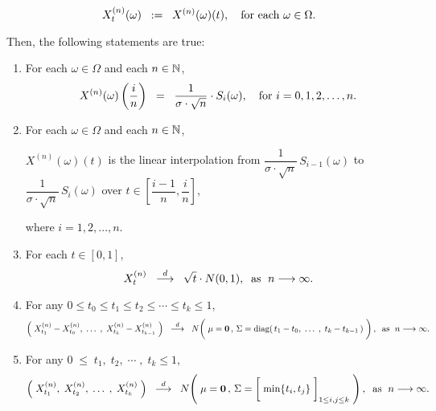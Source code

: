 \begin{proposition}
\begin{itemize}
\begin{equation*}
		X^{(n)}_{t}(\omega) \;\; := \;\; X^{(n)}(\omega)(t),
		\quad
		\textnormal{for each $\omega \in \Omega$}.
		\end{equation*}
\end{itemize}
Then, the following statements are true:
\begin{enumerate}
\item	For each $\omega \in \Omega$ and each $n \in \mathbb{N}$,
		\begin{equation*}
		X^{(n)}(\omega)\left(\dfrac{i}{n}\right) \;\; = \;\; \dfrac{1}{\sigma\cdot\sqrt{n}}\cdot S_{i}(\omega),
		\quad
		\textnormal{for $i = 0, 1, 2, \ldots, n$}.
		\end{equation*}
\item	For each $\omega \in \Omega$ and each $n \in \mathbb{N}$, 
		\begin{center}
		$X^{(n)}(\omega)(t)$\; is the linear interpolation
		from \;$\dfrac{1}{\sigma\cdot\sqrt{n}}\,S_{i-1}(\omega)$\;
		to \;$\dfrac{1}{\sigma\cdot\sqrt{n}}\,S_{i}(\omega)$\;
		over \;$t \in \left[\dfrac{i-1}{n},\dfrac{i}{n}\right]$,
		\end{center}
		where $i = 1, 2, \ldots, n$.
\item	For each $t \in [0,1]$,
		\begin{equation*}
		X^{(n)}_{t} \;\; \overset{d}{\longrightarrow} \;\; \sqrt{t}\cdot N(0,1),
		\;\;\textnormal{as \;$n \longrightarrow \infty$}.
		\end{equation*}
\item	For any \;$0 \leq t_{0} \leq t_{1} \leq t_{2} \leq \cdots \leq t_{k} \leq 1$,
		\begin{equation*}
		\left(\;X^{(n)}_{t_{1}} - X^{(n)}_{t_{0}}, \;\ldots\;,\; X^{(n)}_{t_{k}} - X^{(n)}_{t_{k-1}}\;\right)
		\;\; \overset{d}{\longrightarrow} \;\;
		N\!\left(\;
		\mathbf{\mu} = \mathbf{0}\,,\,
		\overset{{\color{white}1}}{\Sigma} = \diag\!\left(\,t_{1}-t_{0},\; \ldots\; ,\; t_{k}-t_{k-1}\,\right)
		\;\right),
		\;\;
		\textnormal{as \;$n \longrightarrow \infty$}.
		\end{equation*}
\item	For any \;$0 \;\leq\; t_{1},\; t_{2}, \;\cdots\;,\; t_{k} \leq 1$,
		\begin{equation*}
		\left(\;X^{(n)}_{t_{1}},\; X^{(n)}_{t_{2}}, \;\ldots\;,\; X^{(n)}_{t_{k}}\;\right)
		\;\; \overset{d}{\longrightarrow} \;\;
		N\!\left(\;
		\mathbf{\mu} = \mathbf{0}\,,\,
		\Sigma = \left[\;\min\{\overset{{\color{white}1}}{t}_{i},t_{j}\}\;\right]_{1\leq i,j\leq k}
		\;\right),
		\;\;\textnormal{as \;$n \longrightarrow \infty$}.
		\end{equation*}
\end{enumerate}
\end{proposition}
